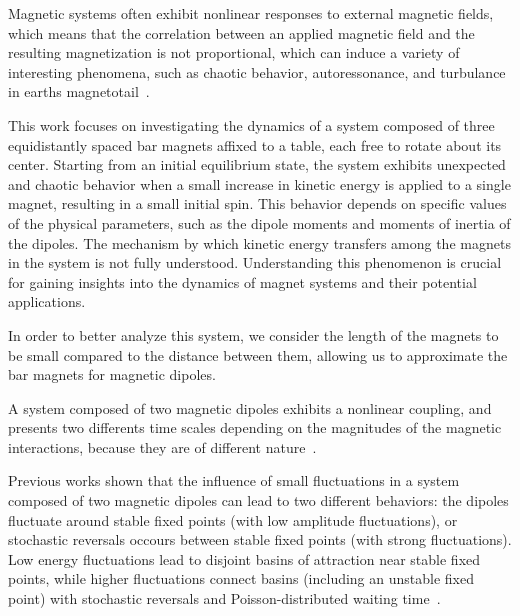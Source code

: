 Magnetic systems often exhibit nonlinear responses to external magnetic fields, which means that the correlation between an applied magnetic field and the resulting magnetization is not proportional, which can induce a variety of interesting phenomena, such as chaotic behavior, autoressonance, and turbulance in earth\textquotesingle s magnetotail~\cite{nonlinearResponse,Bratman1983,Loeb1986,VerandaM,Brunton2017,Chang1999}. 


This work focuses on investigating the dynamics of a system composed of three equidistantly spaced bar magnets affixed to a table, each free to rotate about its center. Starting from an initial equilibrium state, the system exhibits unexpected and chaotic behavior when a small increase in kinetic energy is applied to a single magnet, resulting in a small initial spin. This behavior depends on specific values of the physical parameters, such as the dipole moments and moments of inertia of the dipoles. The mechanism by which kinetic energy transfers among the magnets in the system is not fully understood. Understanding this phenomenon is crucial for gaining insights into the dynamics of magnet systems and their potential applications.

In order to better analyze this system, we consider the length of the magnets to be small compared to the distance between them, allowing us to approximate the bar magnets for magnetic dipoles.

A system composed of two magnetic dipoles exhibits a nonlinear coupling, and presents two differents time scales depending on the magnitudes of the magnetic interactions, because they are of different nature~\cite{LAROZE20081440}. 

Previous works shown that the influence of small fluctuations in a system composed of two magnetic dipoles can lead to two different behaviors: the dipoles fluctuate around stable fixed points (with low amplitude fluctuations), or stochastic reversals occours between stable fixed points (with strong fluctuations). Low energy fluctuations lead to disjoint basins of attraction near stable fixed points, while higher fluctuations connect basins (including an unstable fixed point) with stochastic reversals and Poisson-distributed waiting time~\cite{StochasticReversalDynamics}. 

